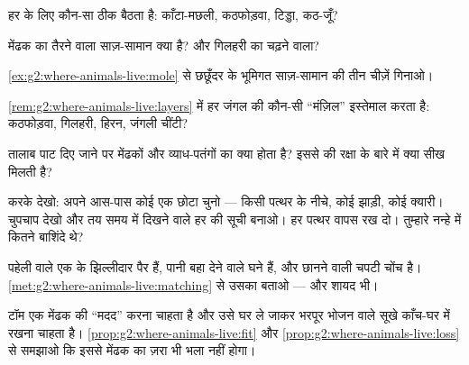 \begin{exercise}[$\star$]\label{exo:g2:where-animals-live:3}
हर  के लिए कौन-सा  ठीक बैठता है: काँटा-मछली, कठफोड़वा, टिड्डा,
कठ-जूँ?
\end{exercise}

\begin{exercise}[$\star$]\label{exo:g2:where-animals-live:4}
मेंढक का तैरने वाला साज़-सामान क्या है? और गिलहरी का  चढ़ने वाला?
\end{exercise}

\begin{exercise}[$\star$]\label{exo:g2:where-animals-live:5}
\cref{ex:g2:where-animals-live:mole} से छछूँदर के भूमिगत साज़-सामान की
तीन चीज़ें गिनाओ।
\end{exercise}

\begin{exercise}[$\star$]\label{exo:g2:where-animals-live:6}
\cref{rem:g2:where-animals-live:layers} में हर  जंगल की कौन-सी
``मंज़िल'' इस्तेमाल करता है: कठफोड़वा, गिलहरी, हिरन, जंगली चींटी?
\end{exercise}

\begin{exercise}[$\star$]\label{exo:g2:where-animals-live:7}
तालाब पाट दिए जाने पर मेंढकों और व्याध-पतंगों का क्या होता है? इससे
 की रक्षा के बारे में क्या सीख मिलती है?
\end{exercise}

\begin{exercise}[$\star$]\label{exo:g2:where-animals-live:8}
करके देखो: अपने आस-पास कोई एक छोटा  चुनो --- किसी पत्थर के नीचे,
कोई झाड़ी, कोई क्यारी। चुपचाप देखो और तय समय में दिखने वाले हर  की
सूची बनाओ। हर पत्थर वापस रख दो। तुम्हारे नन्हे  में कितने बाशिंदे
थे?
\end{exercise}

\begin{exercise}[$\star\star$]\label{exo:g2:where-animals-live:9}
पहेली वाले एक  के झिल्लीदार पैर हैं, पानी बहा देने वाले घने 
हैं, और छानने वाली चपटी चोंच है।
\cref{met:g2:where-animals-live:matching} से उसका  बताओ --- और
शायद  भी।
\end{exercise}

\begin{exercise}[$\star\star$]\label{exo:g2:where-animals-live:10}
टॉम एक मेंढक की ``मदद'' करना चाहता है और उसे घर ले जाकर भरपूर भोजन
वाले सूखे काँच-घर में रखना चाहता है।
\cref{prop:g2:where-animals-live:fit} और
\cref{prop:g2:where-animals-live:loss} से समझाओ कि इससे मेंढक का
ज़रा भी भला नहीं होगा।
\end{exercise}
